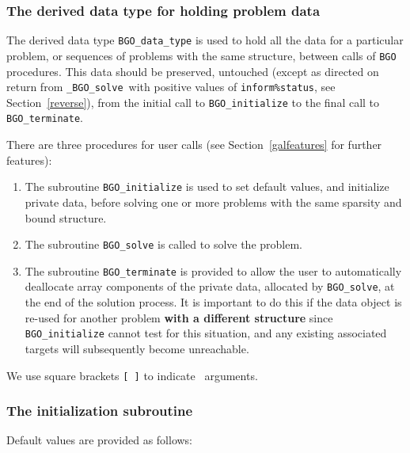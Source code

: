 \documentclass{galahad}
\newcommand{\packagename}{BGO}
\newcommand{\fullpackagename}{\libraryname\_\packagename}
\newcommand{\solver}{{\tt \fullpackagename\_solve}}
\begin{document}

\subsubsection{The derived data type for holding problem data}\label{typedata}
The derived data type
{\tt \packagename\_data\_type}
is used to hold all the data for a particular problem,
or sequences of problems with the same structure, between calls of
{\tt \packagename} procedures.
This data should be preserved, untouched (except as directed on
return from \solver\ with positive values of {\tt inform\%status}, see
Section~\ref{reverse}),
from the initial call to
{\tt \packagename\_initialize}
to the final call to
{\tt \packagename\_terminate}.





\galarguments
There are three procedures for user calls
(see Section~\ref{galfeatures} for further features):

\begin{enumerate}
\item The subroutine
      {\tt \packagename\_initialize}
      is used to set default values, and initialize private data,
      before solving one or more problems with the
      same sparsity and bound structure.
\item The subroutine
      {\tt \packagename\_solve}
      is called to solve the problem.
\item The subroutine
      {\tt \packagename\_terminate}
      is provided to allow the user to automatically deallocate array
       components of the private data, allocated by
       {\tt \packagename\_solve},
       at the end of the solution process.
       It is important to do this if the data object is re-used for another
       problem {\bf with a different structure}
       since {\tt \packagename\_initialize} cannot test for this situation,
       and any existing associated targets will subsequently become unreachable.
\end{enumerate}
We use square brackets {\tt [ ]} to indicate \optional\ arguments.


\subsubsection{The initialization subroutine}\label{subinit}
 Default values are provided as follows:
\vspace*{1mm}
\end{document}
